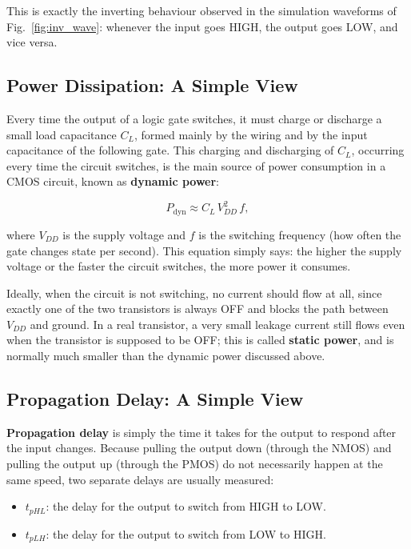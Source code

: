 \documentclass[11pt,a4paper]{article}
\begin{document}
This is exactly the inverting behaviour observed in the simulation
waveforms of Fig.~\ref{fig:inv_wave}: whenever the input goes HIGH, the
output goes LOW, and vice versa.

\subsection{Power Dissipation: A Simple View}
Every time the output of a logic gate switches, it must charge or
discharge a small load capacitance $C_L$, formed mainly by the wiring
and by the input capacitance of the following gate. This charging and
discharging of $C_L$, occurring every time the circuit switches, is the
main source of power consumption in a CMOS circuit, known as
\textbf{dynamic power}:

\begin{equation}
    P_{\text{dyn}} \approx C_{L} \, V_{DD}^{2} \, f,
    \label{eq:pdyn}
\end{equation}

where $V_{DD}$ is the supply voltage and $f$ is the switching frequency
(how often the gate changes state per second). This equation simply
says: the higher the supply voltage or the faster the circuit switches,
the more power it consumes.

Ideally, when the circuit is not switching, no current should flow at
all, since exactly one of the two transistors is always OFF and blocks
the path between $V_{DD}$ and ground. In a real transistor, a very small
leakage current still flows even when the transistor is supposed to be
OFF; this is called \textbf{static power}, and is normally much smaller
than the dynamic power discussed above.

\subsection{Propagation Delay: A Simple View}
\textbf{Propagation delay} is simply the time it takes for the output to
respond after the input changes. Because pulling the output down (through
the NMOS) and pulling the output up (through the PMOS) do not necessarily
happen at the same speed, two separate delays are usually measured:

\begin{itemize}
    \item $t_{pHL}$: the delay for the output to switch from HIGH to LOW.
    \item $t_{pLH}$: the delay for the output to switch from LOW to HIGH.
\end{itemize}
\end{document}

